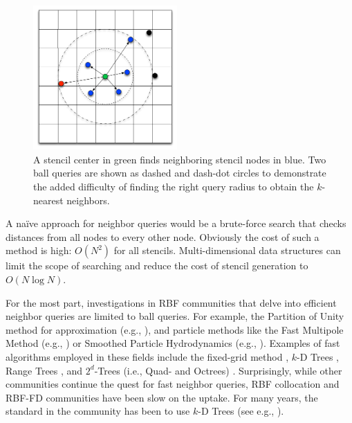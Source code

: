 \documentclass{report}
\begin{document}
\begin{figure}
\centering
\includegraphics[width=5.5cm]{rbffd_methods_content/neighbors/ball_query_vs_kNN.png}
\caption{A stencil center in green finds neighboring stencil nodes in blue. Two ball queries are shown as dashed and dash-dot circles to demonstrate the added difficulty of finding the right query radius to obtain the $k$-nearest neighbors.}
\label{fig:nearest_neighbor_example}
\end{figure}


A na\"{i}ve approach for neighbor queries would be a brute-force search that checks distances from all nodes to every other node. Obviously the cost of such a method is high: $O(N^2)$ for all stencils. Multi-dimensional data structures can limit the scope of searching and reduce the cost of stencil generation to $O(N \log{N})$. 

For the most part, investigations in RBF communities that delve into efficient neighbor queries are limited to ball queries. For example, the Partition of Unity method for approximation (e.g., \cite{Wendland2002,WendlandBook}), and particle methods like the Fast Multipole Method (e.g., \cite{Ying2006, Gumerov2003}) or Smoothed Particle Hydrodynamics (e.g., \cite{Krog2010}). Examples of fast algorithms employed in these fields include the fixed-grid method \cite{WendlandBook,Krog2010}, $k$-D Trees \cite{WendlandBook}, Range Trees \cite{Wendland2002,WendlandBook}, and $2^d$-Trees (i.e., Quad- and Octrees) \cite{Gumerov2003, Ying2006}. Surprisingly, while other communities continue the quest for fast neighbor queries, RBF collocation and RBF-FD communities have been slow on the uptake. For many years, the standard in the community has been to use $k$-D Trees (see e.g., \cite{Fasshauer2007, FlyerLehto11,FornbergLehto11}). 
\end{document}
